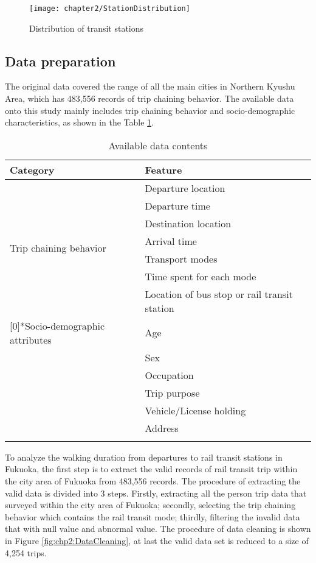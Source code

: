 \begin{figure}[htbp]
	\centering
	\texttt{[image: chapter2/StationDistribution]}
	\caption{Distribution of transit stations}
	\label{fig:chp2:StationDistribution}
\end{figure}

%
\subsection{Data preparation}
The original data covered the range of all the main cities in Northern Kyushu Area, which has 483,556 records of trip chaining behavior. The available data onto this study mainly includes trip chaining behavior and socio-demographic characteristics, as shown in the Table \ref{tab:chp2:Data}.

\begin{table}[htbp]
	\centering
	\caption{Available data contents}
	\label{tab:chp2:Data}
	\small
	\renewcommand{\arraystretch}{1.25} %
	\begin{tabular}{ll}
		\Xhline{1.5pt}
		Category                      & Feature\\
		\midrule
		\multirow{7}[0]{*}{Trip chaining behavior} 
		& Departure location \\
		& Departure time \\
		& Destination location \\
		& Arrival time \\
		& Transport modes \\
		& Time spent for each mode \\
		& Location of bus stop or rail transit station \\
		\Xhline{0.5pt}
		
		\multirow{6}[0]{*}{Socio-demographic attributes}
		& Age \\
		& Sex \\
		& Occupation \\
		& Trip purpose \\
		& Vehicle/License holding \\
		& Address \\
		\Xhline{1.5pt}
	\end{tabular}
\end{table}

%
To analyze the walking duration from departures to rail transit stations in Fukuoka, the first step is to extract the valid records of rail transit trip within the city area of Fukuoka from 483,556 records. The procedure of extracting the valid data is divided into 3 steps. Firstly, extracting all the person trip data that surveyed within the city area of Fukuoka; secondly, selecting the trip chaining behavior which contains the rail transit mode; thirdly, filtering the invalid data that with null value and abnormal value. The procedure of data cleaning is shown in Figure \ref{fig:chp2:DataCleaning}, at last the valid data set is reduced to a size of 4,254 trips.

